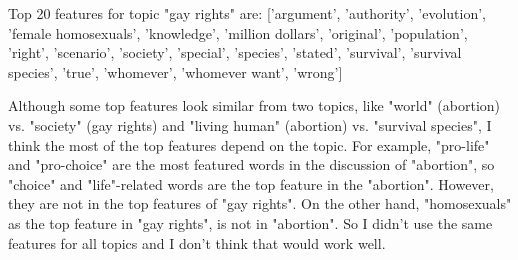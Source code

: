\documentclass{article}
\begin{document}
Top 20 features for topic "gay rights" are: ['argument', 'authority', 'evolution', 'female homosexuals', 'knowledge', 'million dollars', 'original', 'population', 'right', 'scenario', 'society', 'special', 'species', 'stated', 'survival', 'survival species', 'true', 'whomever', 'whomever want', 'wrong']
 
Although some top features look similar from two topics, like "world" (abortion) vs. "society" (gay rights) and "living human" (abortion) vs. "survival species", I think the most of the top features depend on the topic. For example, "pro-life" and "pro-choice" are the most featured words in the discussion of "abortion", so "choice" and "life"-related words are the top feature in the "abortion". However, they are not in the top features of "gay rights". On the other hand, "homosexuals" as the top feature in "gay rights", is not in "abortion". So I didn't use the same features for all topics and I don't think that would work well.
\end{document}
